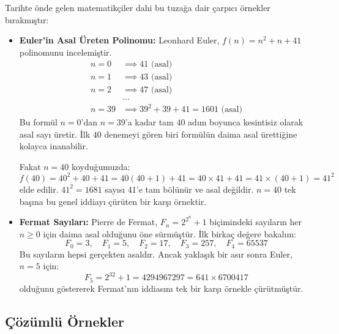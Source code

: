 Tarihte önde gelen matematikçiler dahi bu tuzağa dair çarpıcı örnekler bırakmıştır:
\begin{itemize}
  \item \textbf{Euler'in Asal Üreten Polinomu:} Leonhard Euler, $f(n) = n^2 + n + 41$ polinomunu incelemiştir. 
  \begin{align*}
  n=0 &\implies 41 \text{ (asal)} \\
  n=1 &\implies 43 \text{ (asal)} \\
  n=2 &\implies 47 \text{ (asal)} \\
  &\dots \\
  n=39 &\implies 39^2 + 39 + 41 = 1601 \text{ (asal)}
  \end{align*}
  Bu formül $n=0$'dan $n=39$'a kadar tam $40$ adım boyunca kesintisiz olarak asal sayı üretir. İlk $40$ denemeyi gören biri formülün daima asal ürettiğine kolayca inanabilir.
  
  Fakat $n = 40$ koyduğumuzda:
  \[ f(40) = 40^2 + 40 + 41 = 40(40 + 1) + 41 = 40 \times 41 + 41 = 41 \times (40 + 1) = 41^2 \]
  elde edilir. $41^2 = 1681$ sayısı $41$'e tam bölünür ve asal değildir. $n = 40$ tek başına bu genel iddiayı çürüten bir karşı örnektir.

  \item \textbf{Fermat Sayıları:} Pierre de Fermat, $F_n = 2^{2^n} + 1$ biçimindeki sayıların her $n \ge 0$ için daima asal olduğunu öne sürmüştür. İlk birkaç değere bakalım:
  \[ F_0 = 3, \quad F_1 = 5, \quad F_2 = 17, \quad F_3 = 257, \quad F_4 = 65537 \]
  Bu sayıların hepsi gerçekten asaldır. Ancak yaklaşık bir asır sonra Euler, $n = 5$ için:
  \[ F_5 = 2^{32} + 1 = 4294967297 = 641 \times 6700417 \]
  olduğunu göstererek Fermat'nın iddiasını tek bir karşı örnekle çürütmüştür.
\end{itemize}

\subsection{Çözümlü Örnekler}

